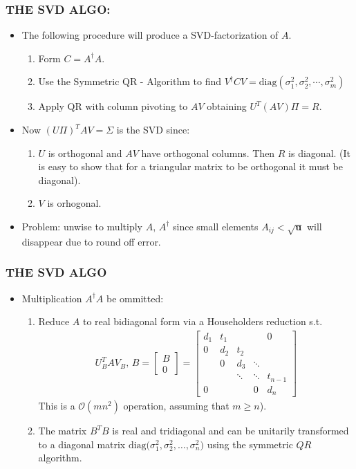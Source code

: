 \documentclass[a4paper,8pt]{beamer} %
\newcommand{\ts}[1]{\textbf{#1}}
\newcommand{\diag}[1]{\text{diag}{#1}}
\newcommand{\smatrix}[1]{\left[\begin{matrix} #1 \end{matrix}\right]}
\begin{document}
\begin{frame}%
\frametitle{THE SVD ALGO:}
\begin{itemize}
	\item The following procedure will produce a SVD-factorization of $A$. 
		\begin{enumerate}
			\item Form $C=A^\dagger A$.
			\item Use the Symmetric QR - Algorithm to find 
				$V^\dagger CV = \diag{(\sigma_{1}^2,\sigma_{2}^2,\cdots,\sigma_{m}^2)}$
			\item Apply QR with column pivoting to $AV$  obtaining $U^T(AV)\Pi=R$.
		\end{enumerate}
	\item Now  $(U\Pi)^T A V = \Sigma$ is the SVD since:
		\begin{enumerate}
			\item $U$ is orthogonal and $AV$ have orthogonal columns. Then $R$ is diagonal.  
				(It is easy to show that for a triangular matrix to be orthogonal it must be diagonal).
			\item $V$ is orhogonal.
		\end{enumerate}
	\item Problem: unwise to multiply $A,\,A^\dagger$ since small elements  
		$A_{ij}<\sqrt{\ts u}$ will disappear due to round off error.
\end{itemize}
\end{frame}%

\begin{frame}%
	\frametitle{THE SVD ALGO}
	\begin{itemize}
		\item Multiplication $A^\dagger A$ be ommitted:
			\begin{enumerate}
				\item Reduce $A$ to real bidiagonal form via a Householders reduction s.t. 
					\begin{align}
						U_B^T A V_B ,\, B= \smatrix{B\\0} = 
						\smatrix{
							d_1 & t_1 & & & 0\\
							0 & d_2 & t_2 & & \\
							& 0 & d_3 & \ddots & \\
							& & \ddots	& \ddots & t_{n-1} \\
							0& & & 0& d_n 
						}
					\end{align}
					This is a $\mathcal O(mn^2)$ operation, assuming that $m\ge n$).
				\item The matrix $B^TB$ is real and tridiagonal and can be unitarily transformed to a diagonal matrix 
						$\diag (\sigma_1^2, \sigma_2^2,\dots, \sigma_n^2)$ using the symmetric $QR$ algorithm.
			\end{enumerate}
	\end{itemize}
\end{frame}%
\end{document}
